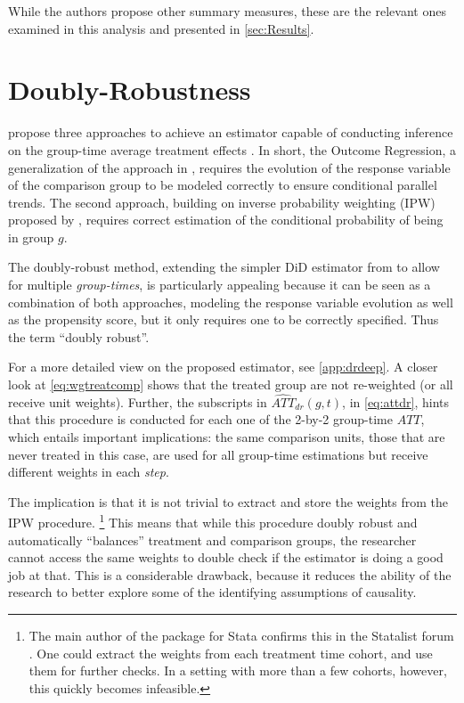 While the authors propose other summary measures, these are the relevant ones examined in this
analysis and presented in \cref{sec:Results}. %

\section{Doubly-Robustness}

\citeauthor{cs2021did_mtp} propose three approaches to achieve an estimator capable of conducting
inference on the group-time average treatment effects \autocite[Sec. 4]{cs2021did_mtp}. In short, the Outcome
Regression, a generalization of the approach in \textcite{heckman.etal1997matching}, requires the evolution of
the response variable of the comparison group to be modeled correctly to ensure conditional parallel trends.
The second approach, building on inverse probability weighting (IPW) proposed by
\textcite{abadie2005semiparametric}, requires correct estimation of the conditional probability of being in
group $g$.


The doubly-robust method, extending the simpler DiD estimator from
\textcite{santanna.zhao2020doubly} to allow for multiple \textit{group-times}, is particularly appealing
because it can be seen as a combination of both approaches, modeling the response variable evolution
as well as the propensity score, but it only requires one to be correctly specified. Thus the 
term ``doubly robust''. 


For a more detailed view on the proposed estimator, see \cref{app:drdeep}. A closer look at
\cref{eq:wgtreatcomp} shows that the treated group are not re-weighted (or all receive unit
weights). Further, the subscripts in $\widehat{ATT}_{d r}(g, t)$, in \cref{eq:attdr}, hints that
this procedure is conducted for each one of the 2-by-2 group-time $ATT$, which entails important
implications: the same comparison units, those that are never treated in this case, are used for all
group-time estimations but receive different weights in each \textit{step}.


The implication is that it is not trivial to extract and store the weights from the IPW procedure.%
\footnote{The main author of the  package for Stata \parencite{rios-avila.etal2023csdid}
    confirms this in the Statalist forum \parencite{rios-avila2023SLWeights}. One could extract the
    weights from each treatment time cohort, and use them for further checks. In a setting with
    more than a few cohorts, however, this quickly becomes infeasible.} This means that while
this procedure doubly robust and automatically ``balances'' treatment and comparison groups, the
researcher cannot access the same weights to double check if the estimator is doing a good job at
that. This is a considerable drawback, because it reduces the ability of the research to better
explore some of the identifying assumptions of causality.

